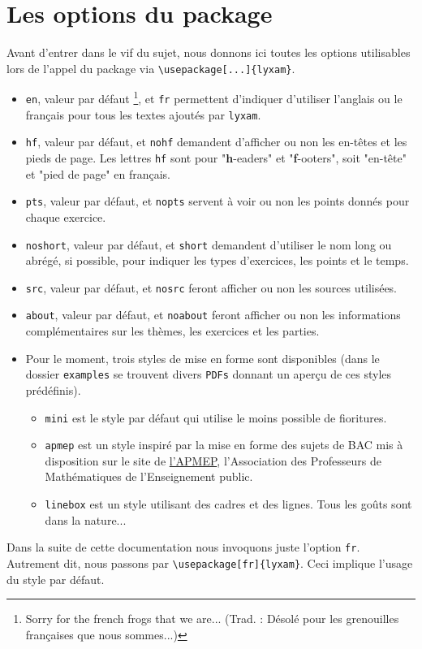 \documentclass[12pt,a4paper]{scrartcl}
\begin{document}
\section{Les options du package}

Avant d'entrer dans le vif du sujet, nous donnons ici toutes les options utilisables lors de l'appel du package via \verb+\usepackage[...]{lyxam}+.

\begin{itemize}
	\item \verb+en+, valeur par défaut
	\footnote{
		Sorry for the french frogs that we are... (Trad. : Désolé pour les grenouilles françaises que nous sommes...)
	}, et \verb+fr+ permettent d'indiquer d'utiliser l'anglais ou le français pour tous les textes ajoutés par \verb+lyxam+.

	\item \verb+hf+, valeur par défaut, et \verb+nohf+ demandent d'afficher ou non les en-têtes et les pieds de page.
	Les lettres \verb+hf+ sont pour "\textbf{h}-eaders" et "\textbf{f}-ooters", soit "en-tête" et "pied de page" en français.

	\item \verb+pts+, valeur par défaut, et \verb+nopts+ servent à voir ou non les points donnés pour chaque exercice.

	\item \verb+noshort+, valeur par défaut, et \verb+short+ demandent d'utiliser le nom long ou abrégé, si possible, pour indiquer les types d'exercices, les points et le temps.

	\item \verb+src+, valeur par défaut, et \verb+nosrc+ feront afficher ou non les sources utilisées.

	\item \verb+about+, valeur par défaut, et \verb+noabout+ feront afficher ou non les informations complémentaires sur les thèmes, les exercices et les parties.
	\item Pour le moment, trois styles de mise en forme sont disponibles (dans le dossier \verb+examples+ se trouvent divers \verb+PDFs+ donnant un aperçu de ces styles prédéfinis).
	\begin{itemize}[label={\small\textbullet}]
		\item \verb+mini+ est le style par défaut qui utilise le moins possible de fioritures.

		\item \verb+apmep+ est un style inspiré par la mise en forme des sujets de BAC mis à disposition sur le site de \href{https://www.apmep.fr}{l'APMEP}, l'Association des Professeurs de Mathématiques de l'Enseignement public.

		\item \verb+linebox+ est un style utilisant des cadres et des lignes. Tous les goûts sont dans la nature...
	\end{itemize}
\end{itemize}


\begin{remark}
	Dans la suite de cette documentation nous invoquons juste l'option \verb+fr+.
	Autrement dit, nous passons par \verb+\usepackage[fr]{lyxam}+. Ceci implique l'usage du style par défaut.
\end{remark}
\end{document}
